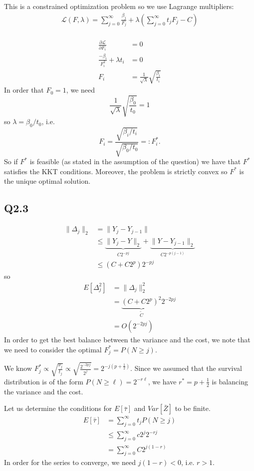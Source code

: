 \documentclass[11pt, a4paper]{article}
\begin{document}
This is a constrained optimization problem so we use Lagrange multipliers:
\begin{align*}
\mathcal{L}(F,\lambda)=\sum_{j=0}^{\infty}\frac{\beta_j}{F_j}+\lambda\left(\sum_{j=0}^{\infty}t_j F_j-C\right)\\
\end{align*}

\begin{align*}
\frac{\partial\mathcal{L}}{\partial F_i} &= 0\\
\frac{-\beta_i}{F_i^2}+\lambda t_i&=0\\
F_i &= \frac{1}{\sqrt{\lambda}}\sqrt{\frac{\beta_i}{t_i}}
\end{align*}
In order that $F_0=1$, we need $$\frac{1}{\sqrt{\lambda}}\sqrt{\frac{\beta_0}{t_0}}=1$$
so $\lambda = \beta_0/t_0$, i.e. $$F_i=\frac{\sqrt{\beta_i/t_i}}{\sqrt{\beta_0/t_0}}=:F^*_i.$$
So if $F^*$ is feasible (as stated in the assumption of the question) we have that
$F^*$ satisfies the KKT conditions. Moreover, the problem is strictly convex so $F^*$ is the unique optimal solution.




\subsection*{Q2.3}
\begin{align*}
\|\Delta_j\|_2
&=\|Y_j-Y_{j-1}\|\\
&\le \underbrace{\|Y_j - Y\|_2}_{C2^{-pj}} + \underbrace{\|Y-Y_{j-1}\|_2}_{C2^{-p(j-1)}}\\
&\le (C + C2^p)2^{-pj}
\end{align*}
so
\begin{align*}
E\left[\Delta_j^2\right]&=\|\Delta_j\|_2^2\\
&=\underbrace{\left(C + C2^p\right)^2}_{\tilde{C}} 2^{-2pj}\\
&=O(2^{-2pj})
\end{align*}
In order to get the best balance between the variance and the cost, we note that we need
to consider the optimal $F^*_j=P(N\ge j)$.

We know $F^*_j \propto \sqrt{\frac{\nu_j}{t_j}} \propto \sqrt{\frac{2^{-2pj}}{2^j}}=2^{-j(p+\frac12)}$.
Since we assumed that the survival distribution is of the form $P(N\ge \ell)=2^{-r\ell}$,
we have $r^*=p + \frac12$ is balancing the variance and the cost.

Let us determine the conditions for $E[\bar{\tau}]$ and $Var[\bar{Z}]$ to be finite.
\begin{align*}
    E[\bar{\tau}]
    &= \sum_{j=0}^{\infty} t_j P(N\ge j)\\
    &\le \sum_{j=0}^{\infty}c2^j2^{-rj}\\
    &= \sum_{j=0}^{\infty}C 2^{j(1-r)}
\end{align*}
In order for the series to converge, we need $j(1-r)<0$, i.e. $r>1$.
\end{document}
